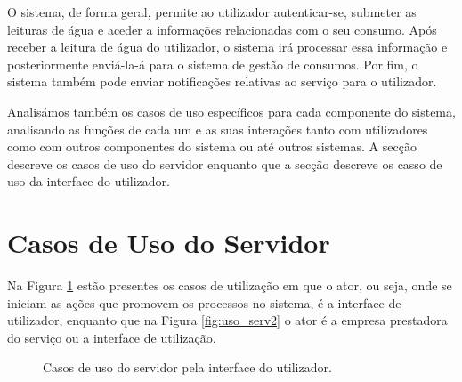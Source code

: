 O sistema, de forma geral, permite ao utilizador autenticar-se, submeter as leituras de água e aceder a informações relacionadas com o seu consumo. Após receber a leitura de água do utilizador, o sistema irá processar essa informação e posteriormente enviá-la-á para o sistema de gestão de consumos. Por fim, o sistema também pode enviar notificações relativas ao serviço para o utilizador.\par
Analisámos também os casos de uso específicos para cada componente do sistema, analisando as funções de cada um e as suas interações tanto com utilizadores como com outros componentes do sistema ou até outros sistemas. A secção \label{sec:casos_servidor} descreve os casos de uso do servidor enquanto que a secção \label{sec:casos_iu} descreve os casso de uso da interface do utilizador.

\section{Casos de Uso do Servidor} \label{sec:casos_servidor}
Na Figura \ref{fig:uso_serv1} estão presentes os casos de utilização em que o ator, ou seja, onde se iniciam as ações que promovem os processos no sistema, é a interface de utilizador, enquanto que na Figura \ref{fig:uso_serv2} o ator é a empresa prestadora do serviço ou a interface de utilização.

\begin{figure}[h!]
\begin{center}
\caption{Casos de uso do servidor pela interface do utilizador.}
\label{fig:uso_serv1}
\end{center}
\end{figure}

